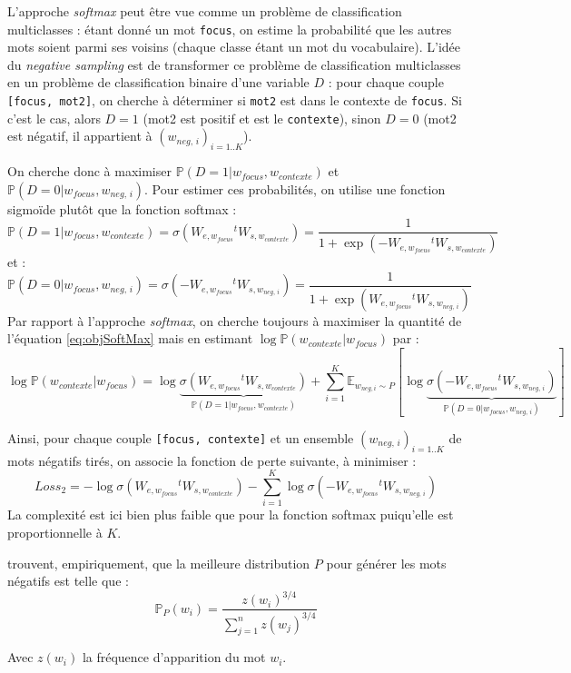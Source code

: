 \documentclass[11pt,french,french]{article}
\begin{document}
L'approche \emph{softmax} peut être vue comme un problème de
classification multiclasses : étant donné un mot \texttt{focus}, on
estime la probabilité que les autres mots soient parmi ses voisins
(chaque classe étant un mot du vocabulaire). L'idée du \emph{negative
sampling} est de transformer ce problème de classification multiclasses
en un problème de classification binaire d'une variable \(D\) : pour
chaque couple \texttt{{[}focus,\ mot2{]}}, on cherche à déterminer si
\texttt{mot2} est dans le contexte de \texttt{focus}. Si c'est le cas,
alors \(D=1\) (mot2 est positif et est le \texttt{contexte}), sinon
\(D=0\) (mot2 est négatif, il appartient à \((w_{neg,\,i})_{i=1..K}\)).

On cherche donc à maximiser
\(\mathbb P(D=1\vert w_{focus},w_{contexte})\) et
\(\mathbb P(D=0\vert w_{focus},w_{neg,\,i})\). Pour estimer ces
probabilités, on utilise une fonction sigmoïde plutôt que la fonction
softmax : \[
\mathbb P(D=1\vert w_{focus},w_{contexte})=\sigma(W_{e,w_{focus}}{}^tW_{s,w_{contexte}}) = 
\frac{1}{1+\exp(-W_{e,w_{focus}}{}^tW_{s,w_{contexte}})}
\] et : \[
\mathbb P(D=0\vert w_{focus},w_{neg,\,i})=\sigma(-W_{e,w_{focus}}{}^tW_{s,w_{neg,\,i}}) = 
\frac{1}{1+\exp(W_{e,w_{focus}}{}^tW_{s,w_{neg,\,i}})}
\] Par rapport à l'approche \emph{softmax}, on cherche toujours à
maximiser la quantité de l'équation \eqref{eq:objSoftMax} mais en estimant
\(\log\mathbb P(w_{contexte}\vert w_{focus})\) par : \[
\log\mathbb P(w_{contexte}\vert w_{focus}) =
\log\underbrace{\sigma (W_{e,w_{focus}}{}^tW_{s,w_{contexte}})}_{
\mathbb P(D=1\vert w_{focus},w_{contexte})
}+
\sum_{i=1}^K\mathbb E_{w_{neg,i}\sim P}[
\log
\underbrace{\sigma (-W_{e,w_{focus}}{}^tW_{s,w_{neg,\,i}})}_{
\mathbb P(D=0\vert w_{focus},w_{neg,\,i})
}
]
\]

Ainsi, pour chaque couple \texttt{{[}focus,\ contexte{]}} et un ensemble
\((w_{neg,\,i})_{i=1..K}\) de mots négatifs tirés, on associe la
fonction de perte suivante, à minimiser : \[
Loss_{2}=-\log\sigma (W_{e,w_{focus}}{}^tW_{s,w_{contexte}})
-
\sum_{i=1}^K
\log
\sigma (-W_{e,w_{focus}}{}^tW_{s,w_{neg,\,i}})
\] La complexité est ici bien plus faible que pour la fonction softmax
puiqu'elle est proportionnelle à \(K\).

\cite{MikolovNS} trouvent, empiriquement, que la meilleure distribution
\(P\) pour générer les mots négatifs est telle que : \[
\mathbb P_P(w_i) = \frac{z(w_i)^{3/4}}{
\sum_{j=1}^n z(w_j)^{3/4}
}
\]

Avec \(z(w_i)\) la fréquence d'apparition du mot \(w_i\).
\end{document}
